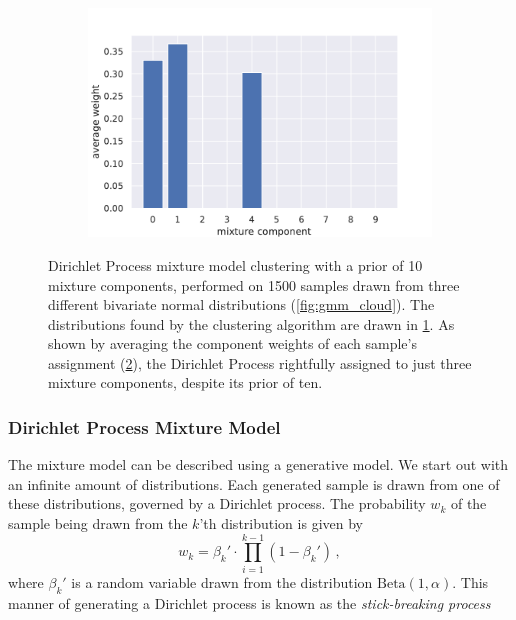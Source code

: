 \begin{figure}[tbp]
\begin{subfigure}[b]{0.49\textwidth}
    \caption{\label{fig:gmm_dist}}
  \end{subfigure}
  \begin{subfigure}[b]{0.75\textwidth}
    \includegraphics[width=\textwidth]{figures/gmm_assignments.pdf}
    \caption{\label{fig:gmm_ass}}
  \end{subfigure}
  \caption{Dirichlet Process mixture model clustering with a prior of 10 mixture
    components, performed on 1500 samples drawn from three different bivariate
    normal distributions (\cref{fig:gmm_cloud}). The distributions found by the
    clustering algorithm are drawn in \cref{fig:gmm_dist}. As shown by averaging
    the component weights of each sample's assignment (\cref{fig:gmm_ass}), the
    Dirichlet Process rightfully assigned to just three mixture components,
  despite its prior of ten.\label{fig:gmm_example}}
\end{figure}

\subsubsection{Dirichlet Process Mixture Model}\label{sec:dp}
The mixture model can be described using a generative model. We start out with
an infinite amount of distributions. Each generated sample is drawn from one of
these distributions, governed by a Dirichlet process. The probability $w_k$ of
the sample being drawn from the $k$'th distribution is given by
\begin{equation}
  w_k = \beta_k' \cdot \prod_{i=1}^{k-1} (1 - \beta_k')\,,
\end{equation}
where $\beta_k'$ is a random variable drawn from the distribution
$\mathrm{Beta}(1, \alpha)$. This manner of generating a Dirichlet process is
known as the \emph{stick-breaking process}


